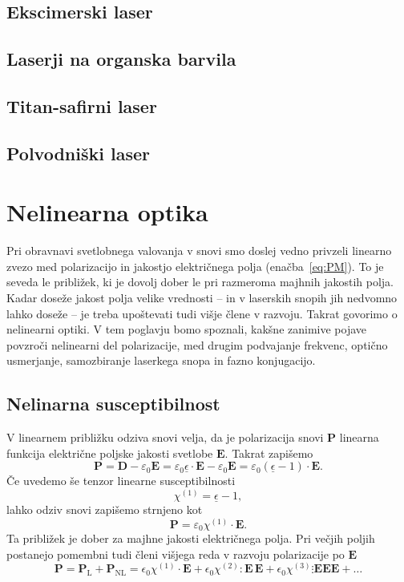 \documentclass[11pt,fleqn]{book} %
\newcommand{\beq}{\begin{equation}}
\newcommand{\eeq}{\end{equation}}
\begin{document}
\section{Ekscimerski laser}
\section{Laserji na organska barvila}
\section{Titan-safirni laser}
\section{Polvodniški laser}


\chapter{Nelinearna optika}

Pri obravnavi svetlobnega valovanja v snovi smo doslej vedno privzeli linearno 
zvezo med polarizacijo in jakostjo električnega polja (enačba~\ref{eq:PM}). To 
je seveda le približek, ki je dovolj dober le pri razmeroma majhnih jakostih
polja. Kadar doseže jakost polja velike vrednosti -- in v laserskih snopih
jih nedvomno lahko doseže -- je treba upoštevati tudi višje člene v razvoju. Takrat
govorimo o nelinearni optiki. V tem poglavju bomo spoznali, 
kakšne zanimive pojave povzroči nelinearni del polarizacije, med drugim podvajanje frekvenc,
optično usmerjanje, samozbiranje laserkega snopa in fazno konjugacijo. 

\section{Nelinarna susceptibilnost}
V linearnem približku odziva snovi velja, da je polarizacija snovi $\mathbf{P}$ linearna 
funkcija električne poljske jakosti svetlobe $\mathbf{E}$. Takrat zapišemo
\beq
\mathbf{P} = \mathbf{D} - \varepsilon_0 \mathbf{E} = 
\varepsilon_0 \underline{\epsilon} \cdot\mathbf{E} - \varepsilon_0 \mathbf{E} = 
\varepsilon_0 (\underline{\epsilon} - 1)\cdot\mathbf{E}. 
\eeq
Če uvedemo še tenzor linearne susceptibilnosti
\beq
\chi^{(1)} = \underline{\epsilon} - 1,
\eeq
lahko odziv snovi zapišemo strnjeno kot
\beq
\mathbf{P} =  \varepsilon_0 \chi^{(1)} \cdot \mathbf{E}.
\eeq
Ta približek je dober za majhne jakosti električnega polja. Pri večjih poljih
postanejo pomembni tudi členi višjega reda v razvoju polarizacije
po $\mathbf{E}$
\begin{equation}
\mathbf{P}=\mathbf{P}_{\mathrm{L}}+\mathbf{P}_{\mathrm{NL}}=
\epsilon_{0} \chi^{(1)}\cdot \mathbf{E}+
\epsilon_{0}\chi^{(2)}:\mathbf{E}\, \mathbf{E}+
\epsilon_{0}\chi^{(3)}\vdots \mathbin \mathbf{E}\mathbin \mathbf{E}\mathbin\mathbf{E} + \dots
\label{8.1}
\end{equation}
\end{document}
